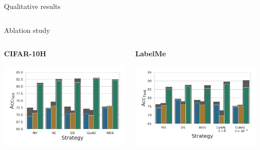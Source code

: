 \begin{frame}{Qualitative results}{}
\begin{columns}
    \end{columns}

\end{frame}

\begin{frame}{Ablation study}{}
    \begin{columns}
        \begin{column}{.5\textwidth}
            \textbf{CIFAR-10H}

            \vspace{.25cm}

            \centering
               \includegraphics[width=\textwidth]{../chapters/images/acc_cifar10H.pdf}

            \end{column}

            \begin{column}{.5\textwidth}
                \textbf{LabelMe}

                \vspace{.25cm}

                \centering
                   \includegraphics[width=\textwidth]{../chapters/images/acc_labelme.pdf}
            \end{column}


\end{columns}
\end{frame}
